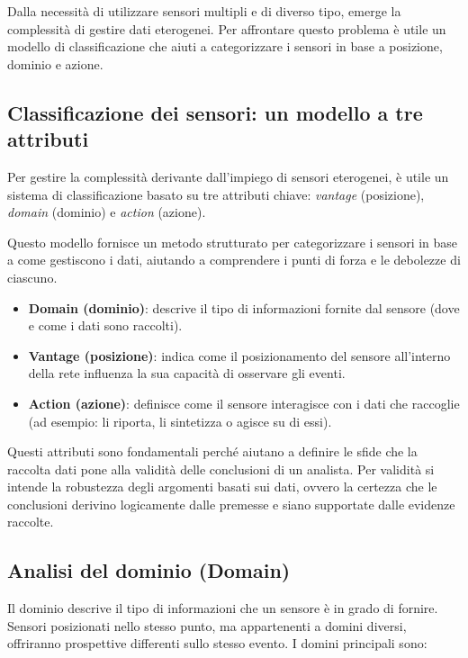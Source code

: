 Dalla necessità di utilizzare sensori multipli e di diverso tipo,
emerge la complessità di gestire dati eterogenei. Per affrontare
questo problema è utile un modello di classificazione che aiuti
a categorizzare i sensori in base a posizione, dominio e azione.

\subsection{Classificazione dei sensori: un modello a tre attributi}

Per gestire la complessità derivante dall'impiego di sensori eterogenei,
è utile un sistema di classificazione basato su tre attributi chiave:
\textit{vantage} (posizione), \textit{domain} (dominio) e \textit{action} (azione).

Questo modello fornisce un metodo strutturato per categorizzare i sensori
in base a come gestiscono i dati, aiutando a comprendere i punti di forza
e le debolezze di ciascuno.

\begin{itemize}
\item \textbf{Domain (dominio)}: descrive il tipo di informazioni fornite
dal sensore (dove e come i dati sono raccolti).
\item \textbf{Vantage (posizione)}: indica come il posizionamento del sensore
all'interno della rete influenza la sua capacità di osservare gli eventi.
\item \textbf{Action (azione)}: definisce come il sensore interagisce con
i dati che raccoglie (ad esempio: li riporta, li sintetizza o agisce su di essi).
\end{itemize}

Questi attributi sono fondamentali perché aiutano a definire le sfide
che la raccolta dati pone alla validità delle conclusioni di un analista.
Per validità si intende la robustezza degli argomenti basati sui dati,
ovvero la certezza che le conclusioni derivino logicamente dalle premesse
e siano supportate dalle evidenze raccolte.

\subsection{Analisi del dominio (Domain)}

Il dominio descrive il tipo di informazioni che un sensore è in grado
di fornire. Sensori posizionati nello stesso punto, ma appartenenti
a domini diversi, offriranno prospettive differenti sullo stesso evento.
I domini principali sono:

